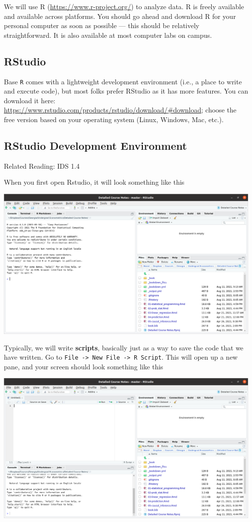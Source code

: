 \documentclass[
  letterpaper,
  DIV=11,
  numbers=noendperiod]{scrreprt}
\begin{document}
We will use R (\url{https://www.r-project.org/}) to analyze data. R is
freely available and available across platforms. You should go ahead and
download R for your personal computer as soon as possible --- this
should be relatively straightforward. It is also available at most
computer labs on campus.

\subsection{RStudio}\label{rstudio}

Base \texttt{R} comes with a lightweight development environment (i.e.,
a place to write and execute code), but most folks prefer RStudio as it
has more features. You can download it here:
\url{https://www.rstudio.com/products/rstudio/download/\#download};
choose the free version based on your operating system (Linux, Windows,
Mac, etc.).

\subsection{RStudio Development
Environment}\label{rstudio-development-environment}

Related Reading: IDS 1.4

When you first open Rstudio, it will look something like this

\includegraphics{open_rstudio.png}

Typically, we will write \textbf{scripts}, basically just as a way to
save the code that we have written. Go to
\texttt{File\ -\textgreater{}\ New\ File\ -\textgreater{}\ R\ Script}.
This will open up a new pane, and your screen should look something like
this

\includegraphics{rstudio_script.png}
\end{document}
